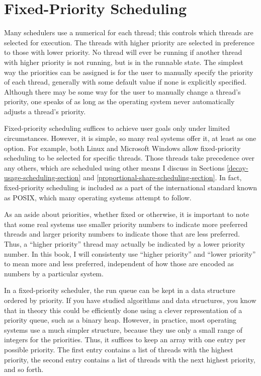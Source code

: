 \section{Fixed-Priority Scheduling}\label{fixed-priority-scheduling-section}

Many schedulers use a numerical  for each thread;
this controls which threads are selected for execution.  The threads with
higher priority are selected in preference to those with lower priority.
No thread will ever be running if another thread with higher priority
is not running, but is in the
runnable state.  The simplest
way the priorities can be assigned is for the user to manually specify
the priority of each thread, generally with some default value if none
is explicitly specified.  Although there may be some way for the user
to manually change a thread's priority, one speaks of 
as long as the operating system never automatically adjusts a
thread's priority.

Fixed-priority scheduling suffices to achieve user goals only under limited
circumstances.  However, it is simple, so many real systems offer it, at least as one option.
For example, both Linux and Microsoft Windows allow fixed-priority
scheduling to be selected for specific threads.  Those threads take
precedence over any others, which are scheduled using other means I
discuss in Sections \ref{decay-usage-scheduling-section} and \ref{proportional-share-scheduling-section}.  In fact, fixed-priority scheduling is
included as a part of the international standard known as POSIX, which
many operating systems attempt to follow.

As an aside about priorities, whether fixed or otherwise, it is
important to note that some real systems use smaller priority numbers
to indicate more preferred threads and larger priority numbers to
indicate those that are less preferred.  Thus, a ``higher priority''
thread  may actually be indicated by a
lower priority number.
In this book, I will consistenty use ``higher priority'' and ``lower
priority'' to mean more and less preferred, independent of how those
are encoded as numbers by a particular system.

In a fixed-priority scheduler, the run queue can be kept in a
data structure ordered by priority.  If you have studied algorithms
and data structures, you know that in theory this could be efficiently
done using a clever representation of a priority queue, such as a
binary heap.  However, in practice, most operating systems use a much
simpler structure, because they use only a small range of integers for
the priorities.  Thus, it suffices to keep an array with one entry per
possible priority.  The first entry contains a list of threads with
the highest priority, the second entry contains a list of threads with
the next highest priority, and so forth.

